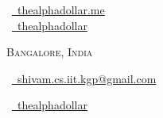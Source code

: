 \documentclass[a4paper,10pt]{extarticle} %
\begin{document}
\pagestyle{empty} %


\begin{multicols}{3}
  \normalsize  \faGlobe\ {\href{https://thealphadollar.me/}{\  thealphadollar.me}}\\
  \normalsize \faGithub\ {\href{https://github.com/thealphadollar}{\  thealphadollar}}\\
  \columnbreak
  \normalsize\par{\centering{\huge\textsc{\textcolor{primary}{Shivam Kumar Jha}}}\par} %
  \par{\centering\normalsize {\textsc{Bangalore, India}}\hfill\par}
  \columnbreak
  \raggedright\hfill\normalsize \faEnvelope\ {\href{mailto:shivam.cs.iit.kgp@gmail.com}{\  shivam.cs.iit.kgp@gmail.com}}\\
  \raggedright\hfill\normalsize \faLinkedinSquare\ {\href{https://www.linkedin.com/in/thealphadollar}{\  thealphadollar}}\\
\end{multicols}
\vspace{-0.4 cm}

\end{document}
